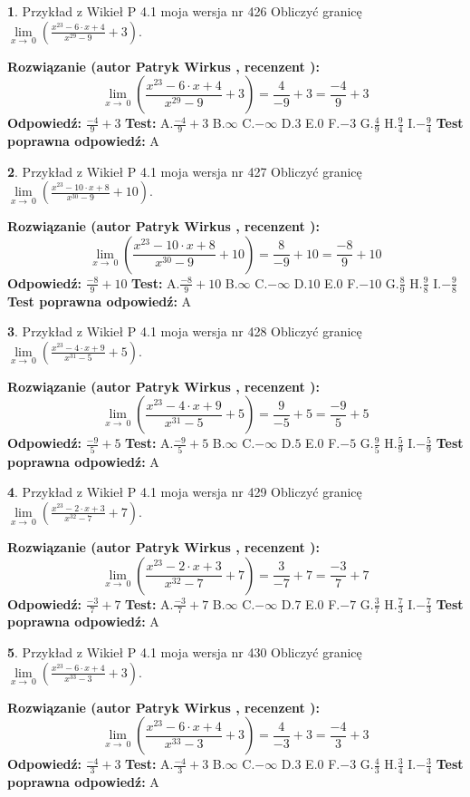 \documentclass[12pt, a4paper]{article}
\theoremstyle{definition} %
\newtheorem{zad}{}
\newcommand{\zadStart}[1]{\begin{zad}#1\newline}
\newcommand{\zadStop}{\end{zad}}
\newcommand{\rozwStart}[2]{\noindent \textbf{Rozwiązanie (autor #1 , recenzent #2): }\newline}
\newcommand{\rozwStop}{\newline}
\newcommand{\odpStart}{\noindent \textbf{Odpowiedź:}\newline}
\newcommand{\odpStop}{\newline}
\newcommand{\testStart}{\noindent \textbf{Test:}\newline}
\newcommand{\testStop}{\newline}
\newcommand{\kluczStart}{\noindent \textbf{Test poprawna odpowiedź:}\newline}
\newcommand{\kluczStop}{\newline}
\begin{document}
\zadStart{Przykład z Wikieł P 4.1 moja wersja nr 426}
Obliczyć granicę $\lim\limits_{x\to\ 0}(\frac{x^{23}-6 \cdot x +4}{x^{29}-9}+3)$.
\zadStop
\rozwStart{Patryk Wirkus}{}
$$\lim\limits_{x\to\ 0}(\frac{x^{23}-6 \cdot x +4}{x^{29}-9}+3)=\frac{4}{-9}+3=\frac{-4}{9}+3$$
\rozwStop
\odpStart
$\frac{-4}{9}+3$
\odpStop
\testStart
A.$\frac{-4}{9}+3$
B.$\infty$
C.$-\infty$
D.$3$
E.$0$
F.$-3$
G.$\frac{4}{9}$
H.$\frac{9}{4}$
I.$-\frac{9}{4}$
\testStop
\kluczStart
A
\kluczStop



\zadStart{Przykład z Wikieł P 4.1 moja wersja nr 427}
Obliczyć granicę $\lim\limits_{x\to\ 0}(\frac{x^{23}-10 \cdot x +8}{x^{30}-9}+10)$.
\zadStop
\rozwStart{Patryk Wirkus}{}
$$\lim\limits_{x\to\ 0}(\frac{x^{23}-10 \cdot x +8}{x^{30}-9}+10)=\frac{8}{-9}+10=\frac{-8}{9}+10$$
\rozwStop
\odpStart
$\frac{-8}{9}+10$
\odpStop
\testStart
A.$\frac{-8}{9}+10$
B.$\infty$
C.$-\infty$
D.$10$
E.$0$
F.$-10$
G.$\frac{8}{9}$
H.$\frac{9}{8}$
I.$-\frac{9}{8}$
\testStop
\kluczStart
A
\kluczStop



\zadStart{Przykład z Wikieł P 4.1 moja wersja nr 428}
Obliczyć granicę $\lim\limits_{x\to\ 0}(\frac{x^{23}-4 \cdot x +9}{x^{31}-5}+5)$.
\zadStop
\rozwStart{Patryk Wirkus}{}
$$\lim\limits_{x\to\ 0}(\frac{x^{23}-4 \cdot x +9}{x^{31}-5}+5)=\frac{9}{-5}+5=\frac{-9}{5}+5$$
\rozwStop
\odpStart
$\frac{-9}{5}+5$
\odpStop
\testStart
A.$\frac{-9}{5}+5$
B.$\infty$
C.$-\infty$
D.$5$
E.$0$
F.$-5$
G.$\frac{9}{5}$
H.$\frac{5}{9}$
I.$-\frac{5}{9}$
\testStop
\kluczStart
A
\kluczStop



\zadStart{Przykład z Wikieł P 4.1 moja wersja nr 429}
Obliczyć granicę $\lim\limits_{x\to\ 0}(\frac{x^{23}-2 \cdot x +3}{x^{32}-7}+7)$.
\zadStop
\rozwStart{Patryk Wirkus}{}
$$\lim\limits_{x\to\ 0}(\frac{x^{23}-2 \cdot x +3}{x^{32}-7}+7)=\frac{3}{-7}+7=\frac{-3}{7}+7$$
\rozwStop
\odpStart
$\frac{-3}{7}+7$
\odpStop
\testStart
A.$\frac{-3}{7}+7$
B.$\infty$
C.$-\infty$
D.$7$
E.$0$
F.$-7$
G.$\frac{3}{7}$
H.$\frac{7}{3}$
I.$-\frac{7}{3}$
\testStop
\kluczStart
A
\kluczStop



\zadStart{Przykład z Wikieł P 4.1 moja wersja nr 430}
Obliczyć granicę $\lim\limits_{x\to\ 0}(\frac{x^{23}-6 \cdot x +4}{x^{33}-3}+3)$.
\zadStop
\rozwStart{Patryk Wirkus}{}
$$\lim\limits_{x\to\ 0}(\frac{x^{23}-6 \cdot x +4}{x^{33}-3}+3)=\frac{4}{-3}+3=\frac{-4}{3}+3$$
\rozwStop
\odpStart
$\frac{-4}{3}+3$
\odpStop
\testStart
A.$\frac{-4}{3}+3$
B.$\infty$
C.$-\infty$
D.$3$
E.$0$
F.$-3$
G.$\frac{4}{3}$
H.$\frac{3}{4}$
I.$-\frac{3}{4}$
\testStop
\kluczStart
A
\kluczStop
\end{document}
